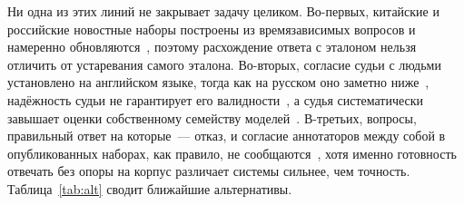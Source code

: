 \documentclass{article}
\begin{document}
Ни одна из этих линий не закрывает задачу целиком. Во-первых, китайские и российские новостные наборы построены из времязависимых вопросов и намеренно обновляются~\cite{chen2025chronoqa,xu2024cdqa,chernogorskii2025dragon}, поэтому расхождение ответа с эталоном нельзя отличить от устаревания самого эталона. Во-вторых, согласие судьи с людьми установлено на английском языке, тогда как на русском оно заметно ниже~\cite{fu2025multilingual,pugachev2025repa}, надёжность судьи не гарантирует его валидности~\cite{norman2026reliability,gienapp2026humans}, а судья систематически завышает оценки собственному семейству моделей~\cite{panickssery2024selfpreference}. В-третьих, вопросы, правильный ответ на которые~--- отказ, и согласие аннотаторов между собой в опубликованных наборах, как правило, не сообщаются~\cite{kirichenko2025abstentionbench,dorosario2026penalty,artstein2008intercoder}, хотя именно готовность отвечать без опоры на корпус различает системы сильнее, чем точность. Таблица~\ref{tab:alt} сводит ближайшие альтернативы.
\end{document}
